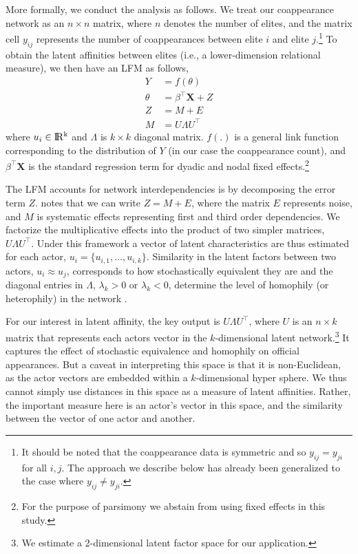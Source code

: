 \documentclass[11pt,english]{article}
\begin{document}
\begin{flushleft}
More formally, we conduct the analysis as follows. We treat our coappearance network as an $n\times n$ matrix, where $n$ denotes the number of elites, and the matrix cell $y_{ij}$ represents the number of coappearances between elite $i$ and elite $j$.\footnote{It should be noted that the coappearance data is symmetric and so $y_{ij}=y_{ji}$ for all $i,j$. The approach we describe below has already been generalized to the case where $y_{ij}\neq y_{ji}$.} To obtain the latent affinities between elites (i.e., a lower-dimension relational measure), we then have an LFM as follows,
\begin{align}
Y & =f(\theta)\\
\theta & =\beta^{\top}\mathbf{X}+Z\\
Z & =M+E\\
M & =U\Lambda U^{\top}
\end{align}
where $u_{i}\in{\rm I\!R^{k}}$ and $\Lambda$ is $k\times k$ diagonal matrix. $f(.)$ is a general link function corresponding to the distribution of $Y$ (in our case the coappearance count), and $\beta^{\top}\mathbf{X}$ is the standard regression term for dyadic and nodal fixed effects.\footnote{For the purpose of parsimony we abstain from using fixed effects in this study.}

The LFM accounts for network interdependencies is by decomposing the error term $Z$. \citet{Hoff2008} notes that we can write $Z=M+E$, where the matrix $E$ represents noise, and $M$ is systematic effects representing first and third order dependencies. We factorize the multiplicative effects into the product of two simpler matrices, $U\Lambda U^{\top}$. Under this framework a vector of latent characteristics are thus estimated for each actor, $u_{i}=\{u_{i,1},\ldots,u_{i,k}\}$. Similarity in the latent factors between two actors, $u_{i}\approx u_{j}$, corresponds to how stochastically equivalent they are and the diagonal entries in $\Lambda$, $\lambda_{k}>0$ or $\lambda_{k}<0$, determine the level of homophily (or heterophily) in the network \citep{Minhas2016a}.

For our interest in latent affinity, the key output is $U\Lambda U^{\top}$, where $U$ is an $n\times k$ matrix that represents each actors vector in the $k$-dimensional latent network.\footnote{We estimate a 2-dimensional latent factor space for our application.} It captures the effect of stochastic equivalence and homophily on official appearances. But a caveat in interpreting this space is that it is non-Euclidean, as the actor vectors are embedded within a $k$-dimensional hyper sphere. We thus cannot simply use distances in this space as a measure of latent affinities. Rather, the important measure here is an actor's vector in this space, and the similarity between the vector of one actor and another.


\end{flushleft}
\end{document}
